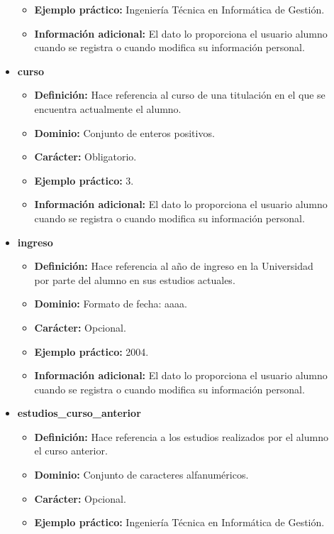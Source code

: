 \begin{description}
\begin{itemize}
\begin{itemize}
         \item \textbf{Ejemplo práctico:} Ingeniería Técnica en Informática de Gestión.
         \item \textbf{Información adicional:} El dato lo proporciona el usuario alumno cuando se registra o cuando modifica su información personal.
      \end{itemize}
   \item \textbf{curso}
      \begin{itemize}
         \item \textbf{Definición:} Hace referencia al curso de una titulación en el que se encuentra actualmente  el alumno.
         \item \textbf{Dominio:} Conjunto de enteros positivos.
         \item \textbf{Carácter:}  Obligatorio.
         \item \textbf{Ejemplo práctico:} 3.
         \item \textbf{Información adicional:} El dato lo proporciona el usuario alumno cuando se registra o cuando modifica su información personal.
      \end{itemize}
   \item \textbf{ingreso}
      \begin{itemize}
         \item \textbf{Definición:} Hace referencia al año de ingreso en la Universidad por parte del alumno en sus estudios actuales.
         \item \textbf{Dominio:} Formato de fecha: aaaa.
         \item \textbf{Carácter:}  Opcional.
         \item \textbf{Ejemplo práctico:} 2004.
         \item \textbf{Información adicional:} El dato lo proporciona el usuario alumno cuando se registra o cuando modifica su información personal.
      \end{itemize}
   \item \textbf{estudios\_curso\_anterior}
      \begin{itemize}
         \item \textbf{Definición:} Hace referencia a los estudios realizados por el alumno el curso anterior.
         \item \textbf{Dominio:} Conjunto de caracteres alfanuméricos.
         \item \textbf{Carácter:}  Opcional.
         \item \textbf{Ejemplo práctico:} Ingeniería Técnica en Informática de Gestión.

\end{itemize}
\end{itemize}
\end{description}
